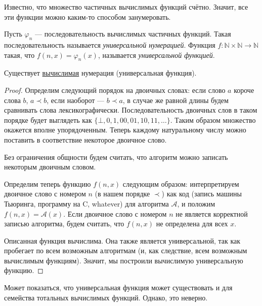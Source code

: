 \documentclass{article}
\begin{document}
    Известно, что множество частичных вычислимых функций счётно. Значит, все эти функции можно
    каким-то способом занумеровать.

    \begin{definition}
        Пусть \(\varphi_n\) --- последовательность вычислимых частичных функций. Такая
        последовательность называется \textit{универсальной нумерацией}. Функция \(f:
        \mathbb{N} \times \mathbb{N} \to \mathbb{N}\) такая, что \(f(n, x) = \varphi_n(x)\), называется
        \textit{универсальной функцией}.
    \end{definition}

    \begin{theorem}
        Существует \underline{вычислимая} нумерация (универсальная функция).
    \end{theorem}

    \begin{proof}
        Определим следующий порядок на двоичных словах: если слово \(a\) короче слова \(b\), \(a \prec
        b\), если наоборот --- \(b \prec a\), в случае же равной длины будем сравнивать слова
        лексикографически. Последовательность двоичных слов в таком порядке будет выглядеть как
        \(\{\bot, 0, 1, 00, 01, 10, 11, \ldots\}\). Таким образом множество окажется вполне упорядоченным.
        Теперь каждому натуральному числу можно поставить в соответствие некоторое двоичное слово.

        Без ограничения общности будем считать, что алгоритм можно записать некоторым двоичным
        словом.

        Определим теперь функцию \(f(n, x)\) следующим образом: интерпретируем двоичное слово
        с номером \(n\) (в нашем порядке \(\prec\)) как код (запись машины Тьюринга, программу на C, whatever)
        для алгоритма \(\mathcal{A}\), и положим \(f(n, x) = \mathcal{A}(x)\). Если двоичное слово
        с номером \(n\) не является корректной записью алгоритма, будем считать, что \(f(n, x)\) не
        определена для всех \(x\).

        Описанная функция вычислима. Она также является универсальной, так как пробегает по всем
        возможным алгоритмам (и, как следствие, всем возможным вычислимым функциям). Значит, мы
        построили вычислимую универсальную функцию.
    \end{proof}

    Может показаться, что универсальная функция может существовать и для семейства тотальных
    вычислимых функций. Однако, это неверно.
\end{document}
